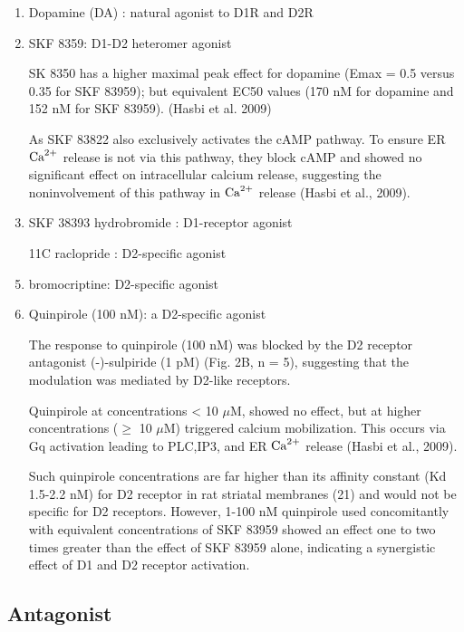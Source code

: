 \begin{enumerate}
  \item Dopamine (DA) : natural agonist to D1R and D2R
  
  
  \item SKF 8359: D1-D2 heteromer agonist
  
SK 8350 has a  higher maximal peak effect for dopamine (Emax = 0.5 versus 0.35
for SKF 83959); but equivalent EC50 values (170 nM for dopamine and 152 nM for
SKF 83959).  (Hasbi et al. 2009)
 
As SKF 83822 also exclusively activates the cAMP pathway. To ensure ER ${\text{Ca}^{2+}}$
release is not via this pathway, they block cAMP and showed no significant
effect on intracellular calcium release, suggesting the noninvolvement of this
pathway in ${\text{Ca}^{2+}}$ release (Hasbi et al., 2009).

  \item SKF 38393 hydrobromide : D1-receptor agonist 

  \item [11C]raclopride : D2-specific agonist 
  
  \item bromocriptine: D2-specific agonist

  \item Quinpirole (100 nM): a D2-specific agonist

The response to quinpirole (100 nM) was blocked by the D2 receptor antagonist
(-)-sulpiride (1 pM) (Fig. 2B, n = 5), suggesting that the modulation was
mediated by D2-like receptors.

Quinpirole at concentrations < 10 $\mu$M, showed no effect, but at higher
concentrations ($\ge$ 10 $\mu$M) triggered calcium mobilization.
This occurs via Gq activation leading to PLC,IP3, and ER ${\text{Ca}^{2+}}$ release (Hasbi
et al., 2009).

Such quinpirole concentrations are far higher than its affinity constant (Kd
1.5-2.2 nM) for D2 receptor in rat striatal membranes (21) and would not be
specific for D2 receptors. However, 1-100 nM quinpirole used concomitantly with
equivalent concentrations of SKF 83959 showed an effect one to two times greater
than the effect of SKF 83959 alone, indicating a synergistic effect of D1 and D2
receptor activation.


\end{enumerate}


\subsection{Antagonist}
\label{sec:DA-receptor-antagonist}

